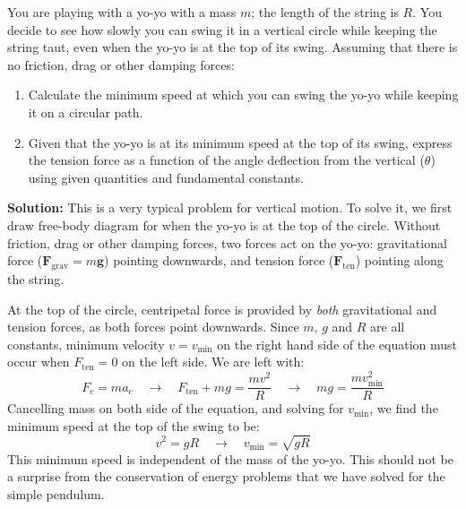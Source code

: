 \begin{example}[Yo-Yo]
  \label{example:yoyo}
  You are playing with a yo-yo with a mass $m$; the length of the string is
  $R$. You decide to see how slowly you can swing it in a vertical circle while
  keeping the string taut, even when the yo-yo is at the top of its swing.
  Assuming that there is no friction, drag or other damping forces:
  \begin{enumerate}[label=(\alph*),leftmargin=18pt,itemsep=6pt]
  \item Calculate the minimum speed at which you can swing the yo-yo while
    keeping it on a circular path.
  \item Given that the yo-yo is at its minimum speed at the top of its swing,
    express the tension force as a function of the angle deflection from the
    vertical ($\theta$) using given quantities and fundamental constants.
  \end{enumerate}
 
  \vspace{.1in}\textbf{Solution:} This is a very typical problem for vertical
  motion. To solve it, we first draw free-body diagram for when the yo-yo is
  at the top of the circle. Without friction, drag or other damping forces, two
  forces act on the yo-yo: gravitational force ($\bm F_\text{grav}=m\bm g$)
  pointing downwards, and tension force ($\bm F_\text{ten}$) pointing along the
  string.
  \begin{center}
  \end{center}
  At the top of the circle, centripetal force is provided by \emph{both}
  gravitational and tension forces, as both forces point downwards. Since $m$,
  $g$ and $R$ are all constants, minimum velocity $v=v_\text{min}$ on the right
  hand side of the equation must occur when $F_\text{ten}=0$ on the left side.
  We are left with:
  \begin{displaymath}
    F_c = ma_c\quad\rightarrow\quad
    F_\text{ten}+mg = \frac{mv^2}R\quad\rightarrow\quad
    mg = \frac{mv_\text{min}^2}R
  \end{displaymath}
  Cancelling mass on both side of the equation, and solving for $v_\text{min}$,
  we find the minimum speed at the top of the swing to be:
  \begin{displaymath}
    v^2=gR\quad\rightarrow\quad\boxed{v_\text{min} = \sqrt{gR}}
  \end{displaymath}
  This minimum speed is independent of the mass of the yo-yo. This should not be
  a surprise from the conservation of energy problems that we have solved for
  the simple pendulum.


\end{example}
